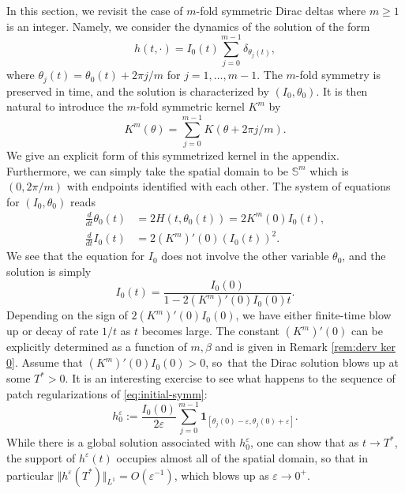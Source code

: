 \documentclass[JEP,XML,SOM,Unicode,NoFloatCountersInSection,published]{cedram}
\theoremstyle{plain}
\theoremstyle{definition}
\newcommand{\nrm}[1]{\Vert#1\Vert}
\let\bt\beta
\let\dlt\delta
\let\tht\theta
\let\varep\varepsilon
\newcommand{\bbS}{\mathbb S}
\begin{document}
In this section, we revisit the case of $m$-fold symmetric Dirac deltas where $m\ge1$ is an integer. Namely, we consider the dynamics of the solution of the form
\begin{equation}\label{eq:initial-symm}
h(t,\cdot) = I_{0}(t) \sum_{j=0}^{m-1} \dlt_{\tht_{j}(t)},
\end{equation}
where $\tht_{j}(t) = \tht_{0}(t) + 2\pi j/m$ for $j = 1,\dots, m-1$. The $m$-fold symmetry is preserved in time, and the solution is characterized by $(I_{0}, \tht_{0})$. It is then natural to introduce the $m$-fold symmetric kernel $K^{m}$ by
\begin{equation*}
K^{m}(\tht) = \sum_{j=0}^{m-1} K(\tht+ 2\pi j/m).
\end{equation*}
We give an explicit form of this symmetrized kernel in the appendix. Furthermore, we can simply take the spatial domain to be $\bbS^{m}$ which is $(0,2\pi/m)$ with endpoints identified with each other. The system of equations for $(I_{0}, \tht_{0})$ reads
\begin{align}\label{eq:dirac-$m$-fold-tht}
\frac{d}{dt} \tht_{0}(t) &= 2H(t,\tht_{0}(t)) = 2 K^{m}(0)I_{0}(t),
\\
\label{eq:dirac-$m$-fold-I}
\frac{d}{dt} I_{0}(t) &= 2 (K^{m})'(0) (I_{0}(t))^2.
\end{align}
We see that the equation for $I_{0}$ does not involve the other variable $\tht_{0}$, and the solution is simply
\begin{equation*}
I_{0}(t) = \frac{I_{0}(0)}{1 - 2 (K^{m})'(0) I_{0}(0) t}.
\end{equation*}
Depending on the sign of $2 (K^{m})'(0) I_{0}(0)$, we have either finite-time blow up or decay of rate $1/t$ as $t$ becomes large. The constant $ (K^{m})'(0) $ can be explicitly determined as a function of $m,\bt$ and is given in Remark \ref{rem:derv ker 0}. Assume that $ (K^{m})'(0) I_{0}(0) > 0$, so~that the Dirac solution blows up at some $T^*>0$. It is an interesting exercise to see what happens to the sequence of patch regularizations of \eqref{eq:initial-symm}:\vspace*{-3pt}
\begin{equation}\label{eq:initial-patch}
h_{0}^{\varep} := \frac{I_{0}(0)}{2\varep} \sum_{j=0}^{m-1} \mathbf{1}_{[\tht_{j}(0)-\varep, \tht_{j}(0)+\varep]}.
\end{equation}
While there is a global solution associated with $h_{0}^{\varep} $, one can show that as $t\to T^*$, the support of $h^{\varep}(t) $ occupies almost all of the spatial domain, so that in particular $\nrm{ h^{\varep} (T^*) }_{L^{1}} = O(\varep^{-1})$, which blows up as $\varep\to 0^+$.
\end{document}
